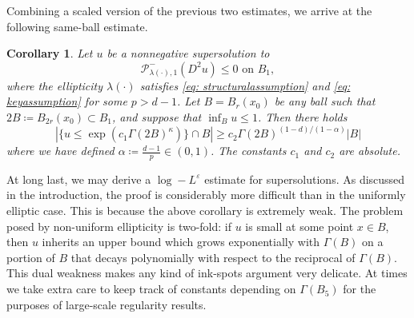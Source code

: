 \documentclass[reqno]{amsart}
\numberwithin{equation}{section}
\newtheorem{cor}[thm]{Corollary}
\numberwithin{equation}{section}
\newcommand{\eps}{\varepsilon}
\newcommand{\ds}{\displaystyle}
\newcounter{case}
\begin{document}
Combining a scaled version of the previous two estimates, we arrive at the following same-ball estimate. 
\begin{cor}
\label{cor: sameball}
 Let $u$ be a nonnegative supersolution to
        $$\mathcal{P}^-_{\lambda(\cdot),1}(D^2u) \le 0 \text{ on } B_1,$$
        where the ellipticity $\lambda(\cdot)$ satisfies \eqref{eq: structuralassumption} and \eqref{eq: keyassumption} for some $p>d-1$. Let $B = B_r(x_0)$ be any ball such that $2B \coloneqq B_{2r}(x_0) \subset B_1$, and suppose that $\ds \inf_B u \le 1$. Then there holds
$$|\{u \le \exp(c_1\Gamma(2B)^\kappa) \} \cap B| \ge c_2\Gamma(2B)^{(1-d)/(1-\alpha)} |B|$$
where we have defined $\alpha \ds \coloneqq   \frac{d-1}{p} \in (0,1)$. The constants $c_1$ and $c_2$ are absolute.
\end{cor}

At long last, we may derive a $\log-L^\eps$ estimate for supersolutions. As discussed in the introduction, the proof is considerably more difficult than in the uniformly elliptic case. This is because the above corollary is extremely weak. The problem posed by non-uniform ellipticity is two-fold: if $u$ is small at some point $x \in B$, then $u$ inherits an upper bound which grows exponentially with $\Gamma(B)$ on a portion of $B$ that decays polynomially with respect to the reciprocal of $\Gamma(B)$. This dual weakness makes any kind of ink-spots argument very delicate. At times we take extra care to keep track of constants depending on $\Gamma(B_5)$ for the purposes of large-scale regularity results. 
\end{document}
